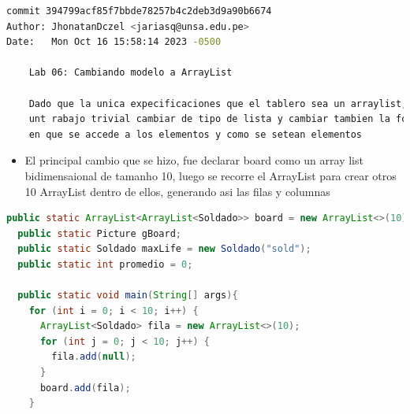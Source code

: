 \begin{lstlisting}[language=bash, caption={Commit principal}]
commit 394799acf85f7bbde78257b4c2deb3d9a90b6674
Author: JhonatanDczel <jariasq@unsa.edu.pe>
Date:   Mon Oct 16 15:58:14 2023 -0500

    Lab 06: Cambiando modelo a ArrayList

    Dado que la unica expecificaciones que el tablero sea un arraylist, es
    unt rabajo trivial cambiar de tipo de lista y cambiar tambien la forma
    en que se accede a los elementos y como se setean elementos
\end{lstlisting}
\begin{itemize}
    \item El principal cambio que se hizo, fue declarar board como un array list bidimensaional de tamanho 10, luego se recorre el ArrayList para crear otros 10 ArrayList dentro de ellos, generando asi las filas y columnas
\end{itemize}
\begin{lstlisting}[language=java, caption={VideoJuego.java}]
  public static ArrayList<ArrayList<Soldado>> board = new ArrayList<>(10);
  public static Picture gBoard;
  public static Soldado maxLife = new Soldado("sold");
  public static int promedio = 0;
  
  public static void main(String[] args){
    for (int i = 0; i < 10; i++) {
      ArrayList<Soldado> fila = new ArrayList<>(10);
      for (int j = 0; j < 10; j++) {
        fila.add(null);
      }
      board.add(fila);
    }
\end{lstlisting}

